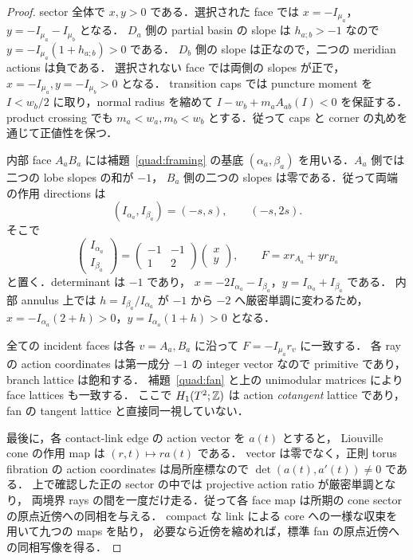 \begin{proof}
sector 全体で $x,y>0$ である．選択された face では
$x=-I_{\mu_a}$，$y=-I_{\mu_a}-I_{\mu_b}$ となる．
$D_a$ 側の partial basin の slope は $h_{a;b}>-1$ なので
$y=-I_{\mu_a}(1+h_{a;b})>0$ である．
$D_b$ 側の slope は正なので，二つの meridian actions は負である．
選択されない face では両側の slopes が正で，$x=-I_{\mu_a},y=-I_{\mu_b}>0$ となる．
transition caps では puncture moment を $I<w_b/2$ に取り，normal radius を縮めて
$I-w_b+m_aA_{ab}(I)<0$ を保証する．product crossing でも
$m_a<w_a,m_b<w_b$ とする．従って caps と corner の丸めを通じて正値性を保つ．

内部 face $A_aB_a$ には補題~\ref{quad:framing} の基底
$(\alpha_a,\beta_a)$ を用いる．$A_a$ 側では二つの lobe slopes の和が $-1$，
$B_a$ 側の二つの slopes は零である．従って両端の作用 directions は
\[
 (I_{\alpha_a},I_{\beta_a})=(-s,s),\qquad(-s,2s).
\]
そこで
\begin{equation}\label{quad:internal-map}
 \begin{pmatrix}I_{\alpha_a}\\I_{\beta_a}\end{pmatrix}
 =\begin{pmatrix}-1&-1\\1&2\end{pmatrix}
   \begin{pmatrix}x\\y\end{pmatrix},
 \qquad F=xr_{A_a}+yr_{B_a}
\end{equation}
と置く．determinant は $-1$ であり，
$x=-2I_{\alpha_a}-I_{\beta_a}$，$y=I_{\alpha_a}+I_{\beta_a}$ である．
内部 annulus 上では $h=I_{\beta_a}/I_{\alpha_a}$ が $-1$ から $-2$ へ厳密単調に変わるため，
$x=-I_{\alpha_a}(2+h)>0$，$y=I_{\alpha_a}(1+h)>0$ となる．

全ての incident faces は各 $v=A_a,B_a$ に沿って
$F=-I_{\mu_a}r_v$ に一致する．
各 ray の action coordinates は第一成分 $-1$ の integer vector なので primitive であり，branch lattice は飽和する．
補題~\ref{quad:fan} と上の unimodular matrices により face lattices も一致する．
ここで $H_1(T^2;\mathbb Z)$ は action \emph{cotangent} lattice であり，fan の tangent lattice と直接同一視していない．

最後に，各 contact-link edge の action vector を $a(t)$ とすると，
Liouville cone の作用 map は $(r,t)\mapsto r a(t)$ である．
vector は零でなく，正則 torus fibration の action coordinates は局所座標なので
$\det(a(t),a'(t))\ne0$ である\cite[Remarks 2.11--2.12]{EM}．
上で確認した正の sector の中では projective action ratio が厳密単調となり，
両境界 rays の間を一度だけ走る．従って各 face map は所期の cone sector の原点近傍への同相を与える．
compact な link による core への一様な収束を用いて九つの maps を貼り，
必要なら近傍を縮めれば，標準 fan の原点近傍への同相写像を得る．
\end{proof}

